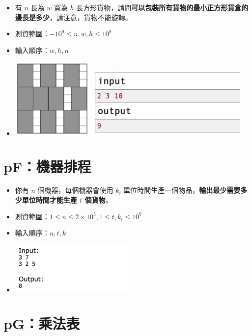 \documentclass[12pt]{article}
\begin{document}
\begin{itemize}[label={}, itemsep=0pt]
    \item 有 $n$ 長為 $w$ 寬為 $h$ 長方形貨物，請問\textbf{可以包裝所有貨物的最小正方形貨倉的邊長是多少}，請注意，貨物不能旋轉。
    \item 測資範圍：$-10^9 \leq n, w, h \leq 10^9$
    \item 輸入順序：$w, h, n$
    \item \includegraphics[width=4.0cm]{img/pE-1.png} \includegraphics[width=8.0cm]{img/pE-2.png}
\end{itemize}

\section*{pF：機器排程}

\begin{itemize}[label={}, itemsep=0pt]
    \item 你有 $n$ 個機器，每個機器會使用 $k_i$ 單位時間生產一個物品，\textbf{輸出最少需要多少單位時間才能生產 $t$ 個貨物}。
    \item 測資範圍：$1 \leq n \leq 2 \times 10^5, 1 \leq t, k_i \leq 10^9$
    \item 輸入順序：$n, t, k$
    \item \includegraphics[width=6.0cm]{img/pF.png}
\end{itemize}

\section*{pG：乘法表}
\end{document}

